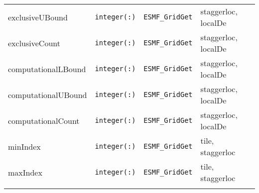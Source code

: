 \begin{tabular}{|l|l|l|l|}
    exclusiveUBound & {\tt integer(:)} & {\tt ESMF\_GridGet} & staggerloc, localDe\\
    exclusiveCount & {\tt integer(:)} & {\tt ESMF\_GridGet} & staggerloc, localDe\\
    computationalLBound & {\tt integer(:)} & {\tt ESMF\_GridGet} & staggerloc, localDe\\
    computationalUBound & {\tt integer(:)} & {\tt ESMF\_GridGet} & staggerloc, localDe\\
    computationalCount & {\tt integer(:)} & {\tt ESMF\_GridGet} & staggerloc, localDe\\
    minIndex & {\tt integer(:)} & {\tt ESMF\_GridGet} & tile, staggerloc\\
    maxIndex & {\tt integer(:)} & {\tt ESMF\_GridGet} & tile, staggerloc\\
    \hline\hline
    \label{AttributeInternalInfo-Get}
\end{tabular}

